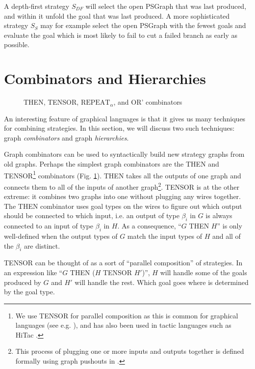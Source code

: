 \documentclass{llncs}
\begin{document}
\begin{example}
A depth-first strategy $S_{DF}$ will select the open PSGraph that was last produced, and within it unfold the
goal that was last produced. A more sophisticated strategy $S_{S}$ may for example select the open PSGraph with the
fewest goals and evaluate the goal which is most likely to fail to cut a failed branch as early as possible.
\end{example}

\beforesection
\section{Combinators and Hierarchies}\label{sec:graph-tactics}
\aftersection

\begin{figure}
\centering
  \caption{\label{fig:then-and-tensor} THEN, TENSOR, $\textrm{REPEAT}_\alpha$, and OR' combinators}
\end{figure}

\noindent An interesting feature of graphical  languages is that it gives us many techniques for
combining strategies. In this section, we will discuss two such techniques: graph \textit{combinators} and graph \textit{hierarchies}.

Graph combinators can be used to syntactically build new strategy graphs from old graphs. Perhaps the simplest graph combinators are the THEN and TENSOR\footnote{We use TENSOR for parallel composition as this is common for graphical languages (see e.g. \cite{paper:Selinger:09}),
and has also been used in tactic languages such as HiTac  \cite{paper:Aspinall:2008}.}
combinators  (Fig. \ref{fig:then-and-tensor}). THEN takes all the outputs of one graph and connects them to all of the inputs of another graph\footnote{This process of plugging one or more inputs and outputs together is defined formally using graph pushouts in \cite{paper:Dixon:10}.}. TENSOR is at the other extreme: it combines two graphs into one without plugging any wires together.
The THEN combinator uses goal types on the wires to figure out which output should be connected to which input, i.e. an output of type $\beta_i$ in $G$ is always connected to an input of type $\beta_i$ in $H$. As a consequence, ``$G$ THEN $H$'' is only well-defined when the output types of $G$ match the input types of $H$ and all of the $\beta_i$ are distinct.

TENSOR can be thought of as a sort of ``parallel composition'' of strategies. In an expression like ``$G$ THEN ($H$ TENSOR $H'$)'', $H$ will handle some of the goals produced by $G$ and $H'$ will handle the rest. Which goal goes where is determined by the goal type.
\end{document}
